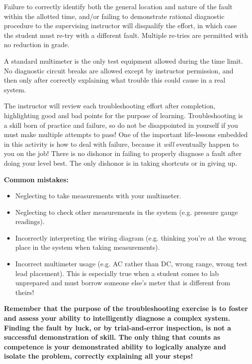 Failure to correctly identify both the general location and nature of the fault within the allotted time, and/or failing to demonstrate rational diagnostic procedure to the supervising instructor will disqualify the effort, in which case the student must re-try with a different fault.  Multiple re-tries are permitted with no reduction in grade.

A standard multimeter is the only test equipment allowed during the time limit.  No diagnostic circuit breaks are allowed except by instructor permission, and then only after correctly explaining what trouble this could cause in a real system.  

The instructor will review each troubleshooting effort after completion, highlighting good and bad points for the purpose of learning.  Troubleshooting is a skill born of practice and failure, so do not be disappointed in yourself if you must make multiple attempts to pass!  One of the important life-lessons embedded in this activity is how to deal with failure, because it {\it will} eventually happen to you on the job!  There is no dishonor in failing to properly diagnose a fault after doing your level best.  The only dishonor is in taking shortcuts or in giving up.

\vskip 10pt

{\bf Common mistakes:}

\begin{itemize}
\item{} Neglecting to take measurements with your multimeter.
\item{} Neglecting to check other measurements in the system (e.g. pressure gauge readings).
\item{} Incorrectly interpreting the wiring diagram (e.g. thinking you're at the wrong place in the system when taking measurements).
\item{} Incorrect multimeter usage (e.g. AC rather than DC, wrong range, wrong test lead placement).  This is especially true when a student comes to lab unprepared and must borrow someone else's meter that is different from theirs!
\end{itemize}

\vskip 10pt

{\bf Remember that the purpose of the troubleshooting exercise is to foster and assess your ability to intelligently diagnose a complex system.  Finding the fault by luck, or by trial-and-error inspection, is not a successful demonstration of skill.  The only thing that counts as competence is your demonstrated ability to logically analyze and isolate the problem, correctly explaining all your steps!}

